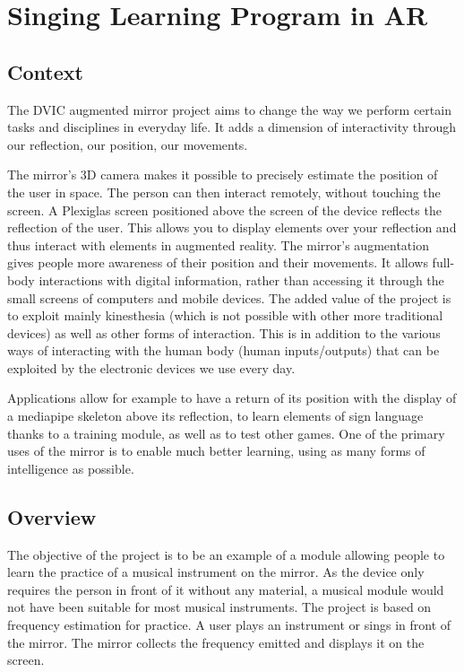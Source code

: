 \section{Singing Learning Program in AR}

\subsection{Context}

The DVIC augmented mirror project aims to change the way we perform certain tasks and disciplines in everyday life.
It adds a dimension of interactivity through our reflection, our position, our movements.

The mirror’s 3D camera makes it possible to precisely estimate the position of the user in  space. The person can then interact remotely, without touching the screen. A Plexiglas screen positioned above the screen of the device reflects the reflection of the user. This allows you to display elements over your reflection and thus interact with elements in augmented reality. The mirror’s augmentation gives people more awareness of their position and their movements. It allows full-body interactions with digital information, rather than accessing it through the small screens of computers and mobile devices. The added value of the project is to exploit mainly kinesthesia (which is not possible with other more traditional devices) as well as other forms of interaction. This is in addition to the various ways of interacting with the human body (human inputs/outputs) that can be exploited by the electronic devices we use every day.

Applications allow for example to have a return of its position with the display of a mediapipe skeleton above its reflection, to learn elements of sign language thanks to a training module, as well as to test other games. One of the primary uses of the mirror is to enable much better learning, using as many forms of intelligence as possible.

\subsection{Overview}

The objective of the project is to be an example of a module allowing people to learn the practice of a musical instrument on the mirror. As the device only requires the person in front of it without any material, a musical module would not have been suitable for most musical instruments.
The project is based on frequency estimation for practice. A user plays an instrument or sings in front of the mirror. The mirror collects the frequency emitted and displays it on the screen.

